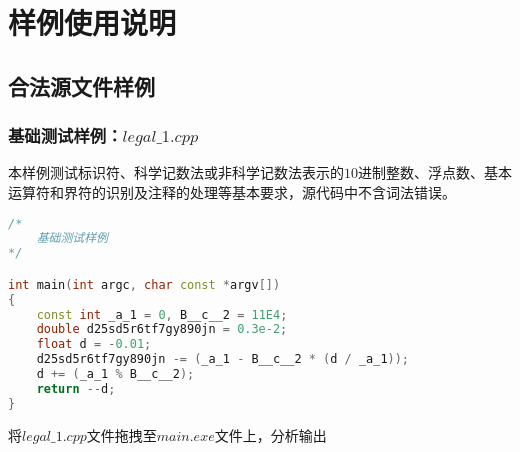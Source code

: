 \documentclass[UTF8]{ctexart}
\begin{document}
\section{样例使用说明}
\subsection{合法源文件样例}
\subsubsection{基础测试样例：$legal\_1.cpp$}
本样例测试标识符、科学记数法或非科学记数法表示的$10$进制整数、浮点数、基本运算符和界符的识别及注释的处理等基本要求，源代码中不含词法错误。
\begin{lstlisting}[language={C++}]
/*
    基础测试样例
*/

int main(int argc, char const *argv[])
{
    const int _a_1 = 0, B__c__2 = 11E4;
    double d25sd5r6tf7gy890jn = 0.3e-2;
    float d = -0.01;
    d25sd5r6tf7gy890jn -= (_a_1 - B__c__2 * (d / _a_1));
    d += (_a_1 % B__c__2);
    return --d;
}
\end{lstlisting}
将$legal\_1.cpp$文件拖拽至$main.exe$文件上，分析输出
\end{document}
